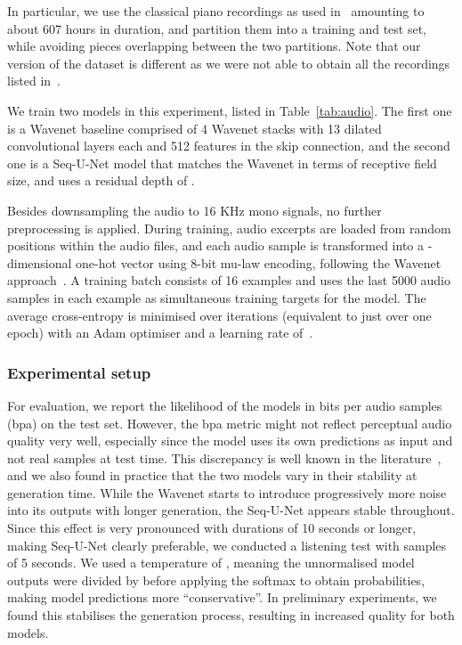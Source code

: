 \documentclass{article}
\begin{document}
In particular, we use the classical piano recordings as used in~\cite{dielemanChallengeRealistic2018} amounting to about 607 hours in duration, and partition them into a training and test set, while avoiding pieces overlapping between the two partitions.
Note that our version of the dataset is different as we were not able to obtain all the recordings listed in~\cite{dielemanChallengeRealistic2018}.

We train two models in this experiment, listed in Table~\ref{tab:audio}.
The first one is a Wavenet baseline comprised of 4 Wavenet stacks with 13 dilated convolutional layers each
and 512 features in the skip connection, and the second one is a Seq-U-Net model that matches the Wavenet in terms of receptive field size, and uses a residual depth of .

Besides downsampling the audio to 16 KHz mono signals, no further preprocessing is applied.
During training, audio excerpts are loaded from random positions within the audio files, and each audio sample is transformed into a -dimensional one-hot vector using 8-bit mu-law encoding, following the Wavenet approach~\cite{dielemanWaveNetGenerative2016}.
A training batch consists of 16 examples and uses the last 5000 audio samples in each example as simultaneous training targets for the model. 
The average cross-entropy is minimised over  iterations (equivalent to just over one epoch) with an Adam optimiser and a learning rate of~. 

\subsubsection{Experimental setup}

For evaluation, we report the likelihood of the models in bits per audio samples (bpa) on the test set. 
However, the bpa metric might not reflect perceptual audio quality very well, especially since the model uses its own predictions as input and not real samples at test time.
This discrepancy is well known in the literature~\cite{huszarHowNot2015}, and we also found in practice that the two models vary in their stability at generation time.
While the Wavenet starts to introduce progressively more noise into its outputs with longer generation, the Seq-U-Net appears stable throughout.
Since this effect is very pronounced with durations of 10 seconds or longer, making Seq-U-Net clearly preferable, we conducted a listening test with samples of 5 seconds.
We used a temperature of , meaning the unnormalised model outputs were divided by  before applying the softmax to obtain probabilities, making model predictions more ``conservative''.
In preliminary experiments, we found this stabilises the generation process, resulting in increased quality for both models.
\end{document}
